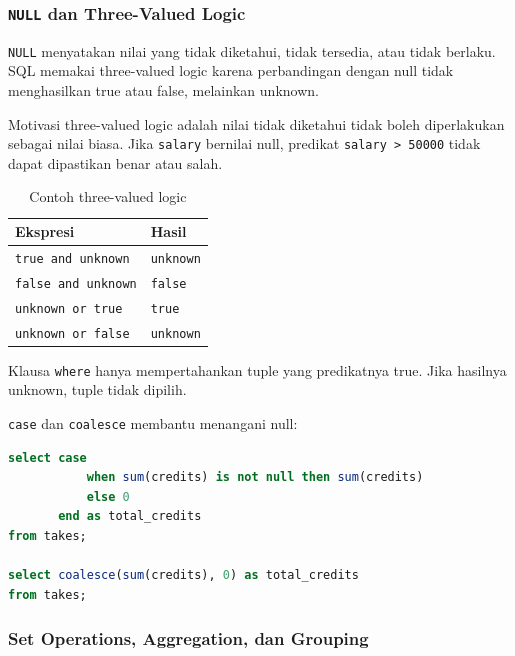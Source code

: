 \subsubsection{\texttt{NULL} dan Three-Valued Logic}

\begin{jawab}
\texttt{NULL} menyatakan nilai yang tidak diketahui, tidak tersedia, atau tidak berlaku. SQL memakai three-valued logic karena perbandingan dengan null tidak menghasilkan true atau false, melainkan unknown.
\end{jawab}

Motivasi three-valued logic adalah nilai tidak diketahui tidak boleh diperlakukan sebagai nilai biasa. Jika \texttt{salary} bernilai null, predikat \texttt{salary > 50000} tidak dapat dipastikan benar atau salah.

\begin{table}[H]
\centering
\begin{tabularx}{\textwidth}{|L{0.25\textwidth}|X|}
\hline
\textbf{Ekspresi} & \textbf{Hasil} \\
\hline
\texttt{true and unknown} & \texttt{unknown} \\
\hline
\texttt{false and unknown} & \texttt{false} \\
\hline
\texttt{unknown or true} & \texttt{true} \\
\hline
\texttt{unknown or false} & \texttt{unknown} \\
\hline
\end{tabularx}
\caption{Contoh three-valued logic}
\label{tab:sql-three-valued}
\end{table}

Klausa \texttt{where} hanya mempertahankan tuple yang predikatnya true. Jika hasilnya unknown, tuple tidak dipilih.

\texttt{case} dan \texttt{coalesce} membantu menangani null:
\begin{lstlisting}[language=SQL, caption={Case dan coalesce}, label={lst:sql-case-coalesce}]
select case
           when sum(credits) is not null then sum(credits)
           else 0
       end as total_credits
from takes;

select coalesce(sum(credits), 0) as total_credits
from takes;
\end{lstlisting}

\subsubsection{Set Operations, Aggregation, dan Grouping}

